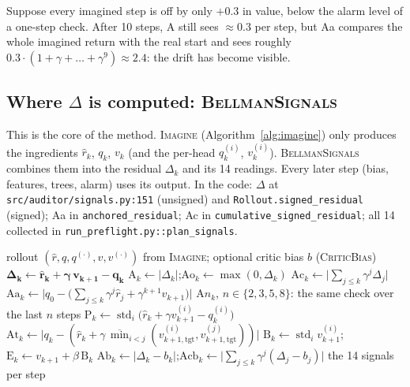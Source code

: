\documentclass[11pt]{article}
\newcommand{\sd}{\operatorname{std}}
\newcommand{\code}[1]{\texttt{#1}}
\begin{document}
\begin{example}[title=Small example: why anchoring helps]
Suppose every imagined step is off by only $+0.3$ in value, below the alarm level of a one-step check. After 10
steps, A still sees $\approx0.3$ per step, but Aa compares the whole imagined return with the real start and sees
roughly $0.3\cdot(1+\gamma+\dots+\gamma^{9})\approx2.4$: the drift has become visible.
\end{example}

\subsection{Where $\Delta$ is computed: \textsc{BellmanSignals}}\label{sec:bellmansignals}

This is the core of the method. \textsc{Imagine} (Algorithm~\ref{alg:imagine}) only produces the ingredients
$\hat r_k$, $q_k$, $v_k$ (and the per-head $q^{(i)}_k$, $v^{(i)}_k$). \textsc{BellmanSignals} combines them into the
residual $\Delta_k$ and its 14 readings. Every later step (bias, features, trees, alarm) uses its output.
In the code: $\Delta$ at \code{src/auditor/signals.py:151} (unsigned) and \code{Rollout.signed\_residual} (signed);
Aa in \code{anchored\_residual}; Ac in \code{cumulative\_signed\_residual}; all 14 collected in
\code{run\_preflight.py::plan\_signals}.

\begin{algorithm}[h]
\caption{\textsc{BellmanSignals}(rollout, $b$) \quad --- the Bellman residual and its 14 readings}\label{alg:bellman}
\begin{algorithmic}[1]
\Require rollout $(\hat r,q,q^{(\cdot)},v,v^{(\cdot)})$ from \textsc{Imagine}; optional critic bias $b$ (\textsc{CriticBias})
  \State $\boldsymbol{\Delta_k\gets\hat r_k+\gamma\,v_{k+1}-q_k}$ 
  \State $\text{A}_k\gets|\Delta_k|$;\quad $\text{Ao}_k\gets\max(0,\Delta_k)$ 
  \State $\text{Ac}_k\gets\bigl|\sum_{j\le k}\gamma^j\Delta_j\bigr|$ 
  \State $\text{Aa}_k\gets\bigl|q_0-\bigl(\sum_{j\le k}\gamma^j\hat r_j+\gamma^{k+1}v_{k+1}\bigr)\bigr|$ 
  \State $\text{A}n_k$, $n\in\{2,3,5,8\}$: the same check over the last $n$ steps
  \State $\text{P}_k\gets\sd_i\bigl(\hat r_k+\gamma v^{(i)}_{k+1}-q^{(i)}_k\bigr)$ 
  \State $\text{At}_k\gets\bigl|q_k-(\hat r_k+\gamma\,\overline{\min}_{i<j}(v^{(i)}_{k+1,\text{tgt}},v^{(j)}_{k+1,\text{tgt}}))\bigr|$ 
  \State $\text{B}_k\gets\sd_i v^{(i)}_{k+1}$;\quad $\text{E}_k\gets v_{k+1}+\beta\,\text{B}_k$ 
    \State $\text{Ab}_k\gets|\Delta_k-b_k|$;\quad $\text{Acb}_k\gets\bigl|\sum_{j\le k}\gamma^j(\Delta_j-b_j)\bigr|$ 
  \EndIf
\EndFor
\State \Return the 14 signals per step 
\end{algorithmic}
\end{algorithm}
\end{document}
